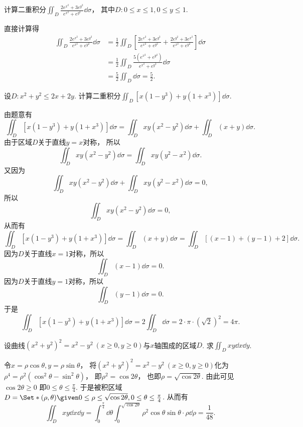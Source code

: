 \begin{example}
计算二重积分\(\iint_D \frac{2 e^{x^2} + 3 e^{y^2}}{e^{x^2} + e^{y^2}} \dd{\sigma}\)，
其中\(D: 0 \leq x \leq 1, 0 \leq y \leq 1\).
\begin{solution}
直接计算得\begin{align*}
	\iint_D \frac{2 e^{x^2} + 3 e^{y^2}}{e^{x^2} + e^{y^2}} \dd{\sigma}
	&= \frac12 \iint_D \left[
		\frac{2 e^{x^2} + 3 e^{y^2}}{e^{x^2} + e^{y^2}}
		+ \frac{2 e^{y^2} + 3 e^{x^2}}{e^{x^2} + e^{y^2}}
	\right] \dd{\sigma} \\
	&= \frac12 \iint_D \frac{5 (e^{x^2} + e^{y^2})}{e^{x^2} + e^{y^2}} \dd{\sigma} \\
	&= \frac52 \iint_D \dd{\sigma}
	= \frac52.
\end{align*}
\end{solution}
\end{example}

\begin{example}
设\(D: x^2+y^2\leq2x+2y\).
计算二重积分\(\iint_D [x(1-y^3)+y(1+x^3)] \dd{\sigma}\).
\begin{solution}
由题意有\[
	\iint_D [x(1-y^3)+y(1+x^3)] \dd{\sigma}
	= \iint_D xy(x^2-y^2) \dd{\sigma}
	+ \iint_D (x+y) \dd{\sigma}.
\]
由于区域\(D\)关于直线\(y=x\)对称，
所以\[
	\iint_D xy(x^2-y^2) \dd{\sigma}
	= \iint_D xy(y^2-x^2) \dd{\sigma}.
\]
又因为\[
	\iint_D xy(x^2-y^2) \dd{\sigma}
	+ \iint_D xy(y^2-x^2) \dd{\sigma}
	= 0,
\]
所以\[
	\iint_D xy(x^2-y^2) \dd{\sigma}
	= 0,
\]
从而有\[
	\iint_D [x(1-y^3)+y(1+x^3)] \dd{\sigma}
	= \iint_D (x+y) \dd{\sigma}
	= \iint_D [(x-1)+(y-1)+2] \dd{\sigma}.
\]
因为\(D\)关于直线\(x=1\)对称，所以\[
	\iint_D (x-1) \dd{\sigma}
	= 0.
\]
因为\(D\)关于直线\(y=1\)对称，所以\[
	\iint_D (y-1) \dd{\sigma}
	= 0.
\]
于是\[
	\iint_D [x(1-y^3)+y(1+x^3)] \dd{\sigma}
	= 2 \iint_D \dd{\sigma}
	= 2 \cdot \pi \cdot (\sqrt2)^2
	= 4\pi.
\]
\end{solution}
\end{example}

\begin{example}
设曲线\((x^2+y^2)^2=x^2-y^2\ (x\geq0,y\geq0)\)与\(x\)轴围成的区域\(D\).
求\(\iint_D x y \dd{x}\dd{y}\).
\begin{solution}
令\(x=\rho\cos\theta,y=\rho\sin\theta\)，
将\((x^2+y^2)^2=x^2-y^2\ (x\geq0,y\geq0)\)化为
\(\rho^4=\rho^2(\cos^2\theta-\sin^2\theta)\)，
即\(\rho^2=\cos2\theta\)，
也即\(\rho=\sqrt{\cos2\theta}\).
由此可见\(\cos2\theta\geq0\)
即\(0\leq\theta\leq\frac\pi4\).
于是被积区域\(D = \Set*{ (\rho,\theta) \given 0\leq\rho\leq\sqrt{\cos2\theta}, 0\leq\theta\leq\frac\pi4 }\).
从而有\begin{equation*}
	\iint_D x y \dd{x}\dd{y}
	= \int_0^{\frac\pi4} \dd{\theta}
	\int_0^{\sqrt{\cos2\theta}} \rho^2 \cos\theta \sin\theta \cdot \rho \dd{\rho}
	= \frac1{48}.
\end{equation*}
\end{solution}
\end{example}
